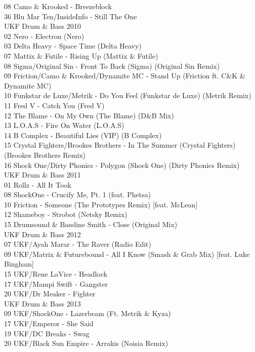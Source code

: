 \begin{multicols}{2}
 08 Camo \& Krooked - Breezeblock\\ 36 Blu Mar Ten/InsideInfo - Still The One\\
 \large UKF Drum \& Bass 2010 \normalsize\\
 02 Nero - Electron (Nero)\\ 03 Delta Heavy - Space Time (Delta Heavy)\\ 07 Mattix \& Futile - Rising Up (Mattix \& Futile)\\ 08 Sigma/Original Sin - Front To Back (Sigma) (Original Sin Remix)\\ 09 Friction/Camo \& Krooked/Dynamite MC - Stand Up (Friction ft. C\&K \& Dynamite MC)\\ 10 Funkstar de Luxe/Metrik - Do You Feel (Funkstar de Luxe) (Metrik Remix)\\ 11 Fred V - Catch You (Fred V)\\ 12 The Blame - On My Own (The Blame) (D\&B Mix)\\ 13 L.O.A.S - Fire On Water (L.O.A.S)\\ 14 B Complex - Beautiful Lies (VIP) (B Complex)\\ 15 Crystal Fighters/Brookes Brothers - In The Summer (Crystal Fighters) (Brookes Brothers Remix)\\ 16 Shock One/Dirty Phonics - Polygon (Shock One) (Dirty Phonics Remix)\\
 \large UKF Drum \& Bass 2011 \normalsize\\
 01 Rollz - All It Took\\ 08 ShockOne - Crucify Me, Pt. 1 (feat. Phetsa)\\ 10 Friction - Someone (The Prototypes Remix) [feat. McLean]\\ 12 Shameboy - Strobot (Netsky Remix)\\ 15 Drumsound \& Bassline Smith - Close (Original Mix)\\
 \large UKF Drum \& Bass 2012 \normalsize\\
 07 UKF/Ayah Marar - The Raver (Radio Edit)\\ 09 UKF/Matrix \& Futurebound - All I Know (Smash \& Grab Mix) [feat. Luke Bingham]\\ 15 UKF/Rene LaVice - Headlock\\ 17 UKF/Mampi Swift - Gangster\\ 20 UKF/Dr Meaker - Fighter\\
 \large UKF Drum \& Bass 2013 \normalsize\\
 09 UKF/ShockOne - Lazerbeam (Ft. Metrik \& Kyza)\\ 17 UKF/Emperor - She Said\\ 19 UKF/DC Breaks - Swag\\ 20 UKF/Black Sun Empire - Arrakis (Noisia Remix)\\\\
 \\

\end{multicols}
